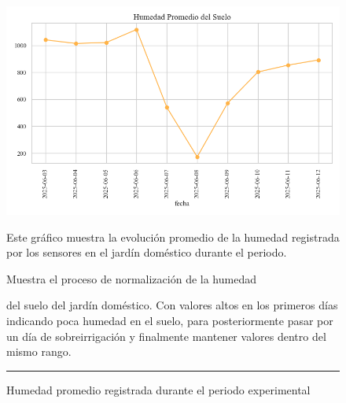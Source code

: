 \documentclass[pdflatex,sn-mathphys-num]{sn-jnl}%
\theoremstyle{thmstyleone}%
\theoremstyle{thmstyletwo}%
\theoremstyle{thmstylethree}%
\begin{document}
\begin{figure}[!ht]
    \centering
    \includegraphics[width=1\textwidth]{assets/humedad_promedio.png}

    \caption{Humedad promedio registrada durante el periodo experimental}
    \label{fig:humedad_del_suelo}

    \vspace{0.4cm}

    \noindent
    \begin{minipage}[t]{0.49\textwidth}
        \justifying
        Este gráfico muestra la evolución promedio de la humedad registrada por los sensores en el jardín doméstico durante el periodo.

        Muestra el proceso de normalización de la humedad
    \end{minipage}%
    \hfill
    \begin{minipage}[t]{0.49\textwidth}
        \justifying
        \noindent del suelo del jardín doméstico. Con valores altos en los primeros días indicando poca humedad en el suelo, para posteriormente pasar por un día de sobreirrigación y finalmente mantener valores dentro del mismo rango.
    \end{minipage}

    \vspace{0.5cm}
    \hrule
\end{figure}
\end{document}

